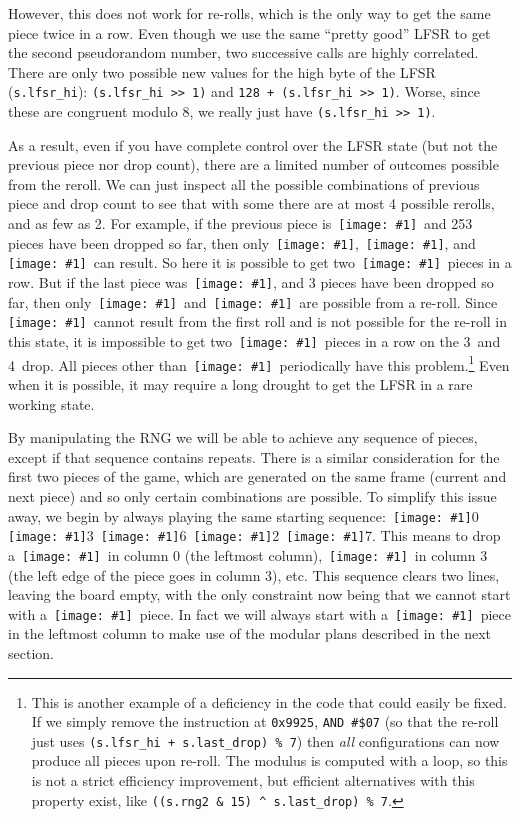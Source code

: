 \documentclass[twocolumn]{article}
\newcommand\tetrispiece[1]{\,\texttt{[image: \#1]}\hspace{0.1em}}
\newcommand\ihoriz{\tetrispiece{i_horiz}}
\newcommand\squarepiece{\tetrispiece{square}}
\newcommand\tup{\tetrispiece{t_up}}
\newcommand\jleft{\tetrispiece{j_left}}
\newcommand\jdown{\tetrispiece{j_down}}
\newcommand\jright{\tetrispiece{j_right}}
\newcommand\zhoriz{\tetrispiece{z_horiz}}
\newcommand\shoriz{\tetrispiece{s_horiz}}
\newcommand\svert{\tetrispiece{s_vert}}
\newcommand\lup{\tetrispiece{l_up}}
\newcommand\lleft{\tetrispiece{l_left}}
\newcommand\lright{\tetrispiece{l_right}}
\begin{document}
However, this does not work for re-rolls, which is the only way to get
the same piece twice in a row. Even though we use the same ``pretty
good'' LFSR to get the second pseudorandom number, two successive
calls are highly correlated. There are only two possible new values
for the high byte of the LFSR (\verb|s.lfsr_hi|):
\verb|(s.lfsr_hi >> 1)| and \verb|128 + (s.lfsr_hi >> 1)|. Worse,
since these are congruent modulo $8$, we really just have
\verb|(s.lfsr_hi >> 1)|.
 
As a result, even if you have complete control over the LFSR state
(but not the previous piece nor drop count), there are a limited
number of outcomes possible from the reroll. We can just inspect all
the possible combinations of previous piece and drop count to see that
with some there are at most 4 possible rerolls, and as few as 2. For
example, if the previous piece is \shoriz\ and 253 pieces have been
dropped so far, then only \tup, \shoriz, and \jdown\ can result. So
here it is possible to get two \shoriz\ pieces in a row. But if the
last piece was \ihoriz, and 3 pieces have been dropped so far, then
only \zhoriz\ and \lup\ are possible from a re-roll. Since
\ihoriz\ cannot result from the first roll and is not possible for the
re-roll in this state, it is impossible to get two \ihoriz\ pieces in
a row on the 3\rd\ and 4\th\ drop. All pieces other than
\squarepiece\ periodically have this problem.\!\footnote{This is
  another example of a deficiency in the code that could easily be
  fixed. If we simply remove the instruction at {\tt 0x9925},
  \verb+AND #$07+ (so that the re-roll just uses
  \verb|(s.lfsr_hi + s.last_drop) % 7|) then {\it all} configurations
  can now produce all pieces upon re-roll. The modulus is computed
  with a loop, so this is not a strict efficiency improvement, but
  efficient alternatives with this property exist,
  like \verb|((s.rng2 & 15) ^ s.last_drop) % 7|.
} Even when it is possible, it may
require a long drought to get the LFSR in a rare working state.

By manipulating the RNG we will be able to achieve any sequence of
pieces, except if that sequence contains repeats. There is a similar
consideration for the first two pieces of the game, which are
generated on the same frame (current and next piece) and so only
certain combinations are possible. To simplify this issue away, we
begin by always playing the same starting sequence: \squarepiece 0
\lleft 3 \jright 6 \lright 2 \jleft 7. This means to drop a
\squarepiece\ in column 0 (the leftmost column), \lleft\ in column 3
(the left edge of the piece goes in column 3), etc. This sequence
clears two lines, leaving the board empty, with the only constraint
now being that we cannot start with a \jleft\ piece. In fact we will
always start with a \svert\ piece in the leftmost column to make
use of the modular plans described in the next section.
\end{document}
